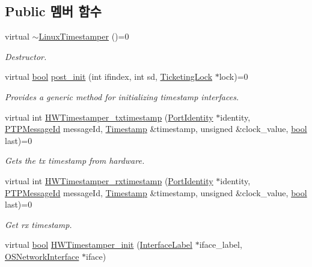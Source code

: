 \subsection*{Public 멤버 함수}
\begin{DoxyCompactItemize}
\item 
virtual \hyperlink{class_linux_timestamper_a0409695c378a1b7d52addc973f21ed8f}{$\sim$\+Linux\+Timestamper} ()=0
\begin{DoxyCompactList}\small\item\em Destructor. \end{DoxyCompactList}\item 
virtual \hyperlink{avb__gptp_8h_af6a258d8f3ee5206d682d799316314b1}{bool} \hyperlink{class_linux_timestamper_ac2055edb1eebef8381ef57e01f55d3e0}{post\+\_\+init} (int ifindex, int sd, \hyperlink{class_ticketing_lock}{Ticketing\+Lock} $\ast$lock)=0
\begin{DoxyCompactList}\small\item\em Provides a generic method for initializing timestamp interfaces. \end{DoxyCompactList}\item 
virtual int \hyperlink{class_ether_timestamper_a82619058d136ce4314189f1c9db91914}{H\+W\+Timestamper\+\_\+txtimestamp} (\hyperlink{class_port_identity}{Port\+Identity} $\ast$identity, \hyperlink{class_p_t_p_message_id}{P\+T\+P\+Message\+Id} message\+Id, \hyperlink{class_timestamp}{Timestamp} \&timestamp, unsigned \&clock\+\_\+value, \hyperlink{avb__gptp_8h_af6a258d8f3ee5206d682d799316314b1}{bool} last)=0
\begin{DoxyCompactList}\small\item\em Gets the tx timestamp from hardware. \end{DoxyCompactList}\item 
virtual int \hyperlink{class_ether_timestamper_afcc61feb25861ff20edbb657170a3c9e}{H\+W\+Timestamper\+\_\+rxtimestamp} (\hyperlink{class_port_identity}{Port\+Identity} $\ast$identity, \hyperlink{class_p_t_p_message_id}{P\+T\+P\+Message\+Id} message\+Id, \hyperlink{class_timestamp}{Timestamp} \&timestamp, unsigned \&clock\+\_\+value, \hyperlink{avb__gptp_8h_af6a258d8f3ee5206d682d799316314b1}{bool} last)=0
\begin{DoxyCompactList}\small\item\em Get rx timestamp. \end{DoxyCompactList}\item 
virtual \hyperlink{avb__gptp_8h_af6a258d8f3ee5206d682d799316314b1}{bool} \hyperlink{class_common_timestamper_abde0de8253fd960807f7f2816c0c5225}{H\+W\+Timestamper\+\_\+init} (\hyperlink{class_interface_label}{Interface\+Label} $\ast$iface\+\_\+label, \hyperlink{class_o_s_network_interface}{O\+S\+Network\+Interface} $\ast$iface)

\end{DoxyCompactItemize}
